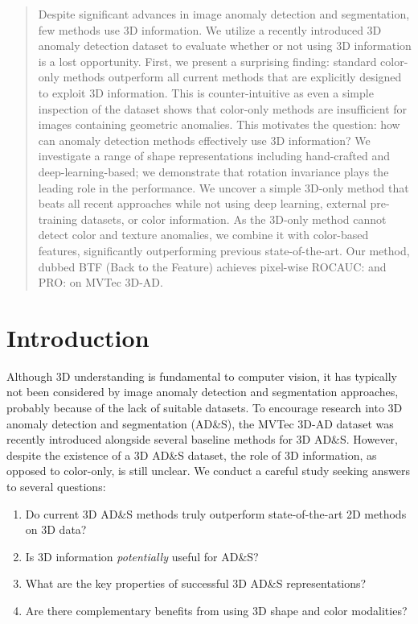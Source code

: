 \documentclass{article}
\begin{document}
\begin{abstract}
Despite significant advances in image anomaly detection and segmentation, few methods use 3D information. We utilize a recently introduced 3D anomaly detection dataset to evaluate whether or not using 3D information is a lost opportunity. First, we present a surprising finding: standard color-only methods outperform all current methods that are explicitly designed to exploit 3D information.
This is counter-intuitive as even a simple inspection of the dataset shows that color-only methods are insufficient for images containing geometric anomalies. This motivates the question: how can anomaly detection methods effectively use 3D information? We investigate a range of shape representations including hand-crafted and deep-learning-based; we demonstrate that rotation invariance plays the leading role in the performance.
We uncover a simple 3D-only method that beats all recent approaches while not using deep learning, external pre-training datasets, or color information.
As the 3D-only method cannot detect color and texture anomalies, we combine it with color-based features, significantly outperforming previous state-of-the-art. Our method, dubbed BTF (Back to the Feature) achieves pixel-wise ROCAUC:  and PRO:  on MVTec 3D-AD. 



\end{abstract}

\section{Introduction}

Although 3D understanding is fundamental to computer vision, it has typically not been considered by image anomaly detection and segmentation approaches, probably because of the lack of suitable datasets.
To encourage research into 3D anomaly detection and segmentation (AD\&S), the MVTec 3D-AD \cite{mvtec3d} dataset was recently introduced alongside several baseline methods for 3D AD\&S.
However, despite the existence of a 3D AD\&S dataset, the role of 3D information, as opposed to color-only, is still unclear.
We conduct a careful study seeking answers to several questions:
\begin{enumerate}
    \item Do current 3D AD\&S methods truly outperform state-of-the-art 2D methods on 3D data?
    \item Is 3D information \textit{potentially} useful for AD\&S?
    \item What are the key properties of successful 3D AD\&S representations?
    \item Are there complementary benefits from using 3D shape and color modalities?
\end{enumerate}
\end{document}
